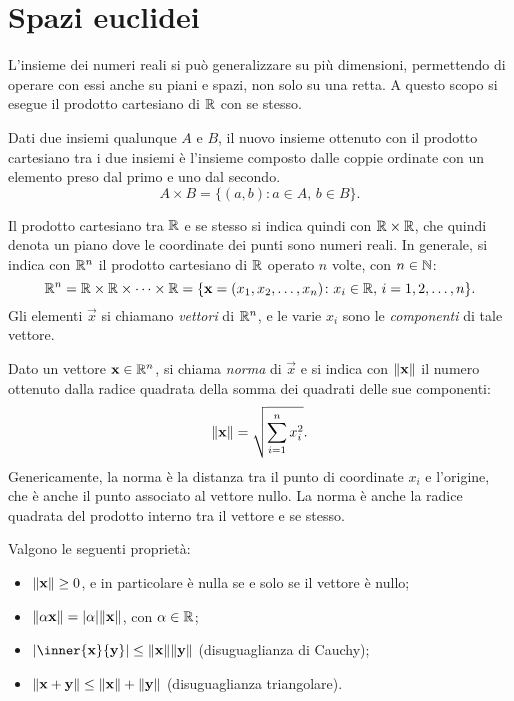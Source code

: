 \section{Spazi euclidei}
L'insieme dei numeri reali si può generalizzare su più dimensioni, permettendo di operare con essi anche su piani e spazi, non solo su una retta. A questo scopo si esegue il prodotto cartesiano di $\mathbb{R}$ con se stesso.
\begin{definizione}
Dati due insiemi qualunque $A$ e $B$, il nuovo insieme ottenuto con il prodotto cartesiano tra i due insiemi è l'insieme composto dalle coppie ordinate con un elemento preso dal primo e uno dal secondo.
\[
A\times B=\{(a,b)\colon a\in A,\,b\in B\}.
\]
\end{definizione}
Il prodotto cartesiano tra $\mathbb{R}$ e se stesso si indica quindi con $\mathbb{R}\times\mathbb{R}$, che quindi denota un piano dove le coordinate dei punti sono numeri reali.
In generale, si indica con $\mathbb{R}^n$ il prodotto cartesiano di $\mathbb{R}$ operato $n$ volte, con $n\in\mathbb{N}$:
\[
\mathbb{R}^n=\mathbb{R}\times\mathbb{R}\times\dots\times\mathbb{R}=\{\mathbf{x}=(x_1,x_2,\dots,x_n)\colon x_i\in\mathbb{R},\,i=1,2,\dots,n\}.
\]
Gli elementi $\vec x$ si chiamano \emph{vettori} di $\mathbb{R}^n$, e le varie $x_i$ sono le \emph{componenti} di tale vettore.
\begin{definizione}
\label{d:norma}
Dato un vettore $\mathbf{x}\in\mathbb{R}^n$, si chiama \emph{norma} di $\vec x$ e si indica con $\lVert\mathbf{x}\rVert$ il numero ottenuto dalla radice quadrata della somma dei quadrati delle sue componenti:
\begin{equation}
\label{eq:norma}
\lVert\mathbf{x}\rVert=\sqrt{\sum_{i=1}^nx_i^2}.
\end{equation}
Genericamente, la norma è la distanza tra il punto di coordinate $x_i$ e l'origine, che è anche il punto associato al vettore nullo.
La norma è anche la radice quadrata del prodotto interno tra il vettore e se stesso.
\end{definizione}
Valgono le seguenti proprietà:
\begin{itemize}
\item $\lVert\mathbf{x}\rVert\geq 0$, e in particolare è nulla se e solo se il vettore è nullo;
\item $\lVert\alpha\mathbf{x}\rVert=\lvert\alpha\rvert\lVert\mathbf{x}\rVert$, con $\alpha\in\mathbb{R}$;
\item $\abs{\inner{\vec x}{\vec y}}\leq\norm{\vec x}\norm{\vec y}$ (disuguaglianza di Cauchy);
\item $\lVert\mathbf{x}+\mathbf{y}\rVert\leq\lVert\mathbf{x}\rVert+\lVert\mathbf{y}\rVert$ (disuguaglianza triangolare).
\end{itemize}
